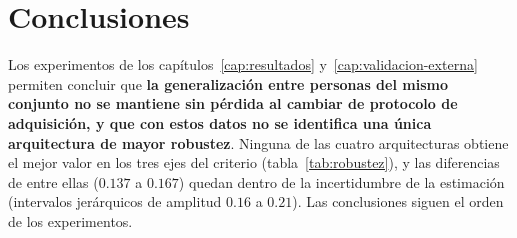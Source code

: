 \chapter{Conclusiones}
\label{cap:conclusiones}

Los experimentos de los capítulos~\ref{cap:resultados} y~\ref{cap:validacion-externa} permiten concluir
que \textbf{la generalización entre personas del mismo conjunto no se mantiene sin pérdida al cambiar de
protocolo de adquisición, y que con estos datos no se identifica una única arquitectura de mayor robustez}.
Ninguna de las cuatro arquitecturas obtiene el mejor valor en los tres ejes del criterio
(tabla~\ref{tab:robustez}), y las diferencias de \idp{} entre ellas ($0.137$ a $0.167$) quedan dentro de la
incertidumbre de la estimación (intervalos jerárquicos de amplitud $0.16$ a $0.21$). Las conclusiones
siguen el orden de los experimentos.

